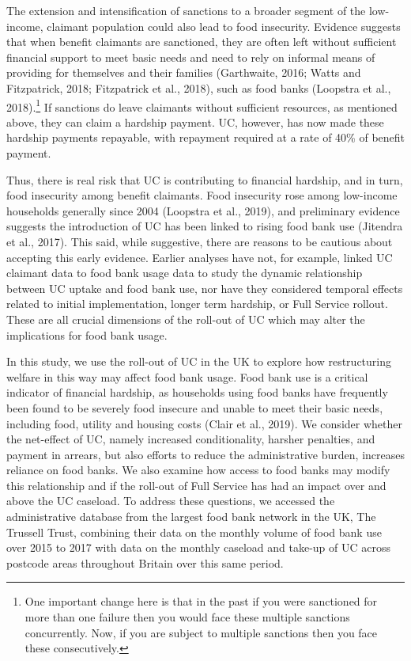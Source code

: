 \documentclass[12pt,article,oneside]{memoir}
\begin{document}
The extension and intensification of sanctions to a broader segment of the low-income, claimant population could also lead to food insecurity. Evidence suggests that when benefit claimants are sanctioned, they are often left without sufficient financial support to meet basic needs and need to rely on informal means of providing for themselves and their families (Garthwaite, 2016; Watts and Fitzpatrick, 2018; Fitzpatrick et al., 2018), such as food banks (Loopstra et al., 2018).\footnote{One important change here is that in the past if you were sanctioned for more than one failure then you would face these multiple sanctions concurrently. Now, if you are subject to multiple sanctions then you face these consecutively.}  If sanctions do leave claimants without sufficient resources, as mentioned above, they can claim a hardship payment. UC, however, has now made these hardship payments repayable, with repayment required at a rate of 40\% of benefit payment. 

Thus, there is real risk that UC is contributing to financial hardship, and in turn, food insecurity among benefit claimants. Food insecurity rose among low-income households generally since 2004 (Loopstra et al., 2019), and preliminary evidence suggests the introduction of UC has been linked to rising food bank use (Jitendra et al., 2017). This said, while suggestive, there are reasons to be cautious about accepting this early evidence. Earlier analyses have not, for example, linked UC claimant data to food bank usage data to study the dynamic relationship between UC uptake and food bank use, nor have they considered temporal effects related to initial implementation, longer term hardship, or Full Service rollout. These are all crucial dimensions of the roll-out of UC which may alter the implications for food bank usage. 

In this study, we use the roll-out of UC in the UK to explore how restructuring welfare in this way may affect food bank usage. Food bank use is a critical indicator of financial hardship, as households using food banks have frequently been found to be severely food insecure and unable to meet their basic needs, including food, utility and housing costs (Clair et al., 2019). We consider whether the net-effect of UC, namely increased conditionality, harsher penalties, and payment in arrears, but also efforts to reduce the administrative burden, increases reliance on food banks. We also examine how access to food banks may modify this relationship and if the roll-out of Full Service has had an impact over and above the UC caseload. To address these questions, we accessed the administrative database from the largest food bank network in the UK, The Trussell Trust, combining their data on the monthly volume of food bank use over 2015 to 2017 with data on the monthly caseload and take-up of UC across postcode areas throughout Britain over this same period. 
\end{document}
